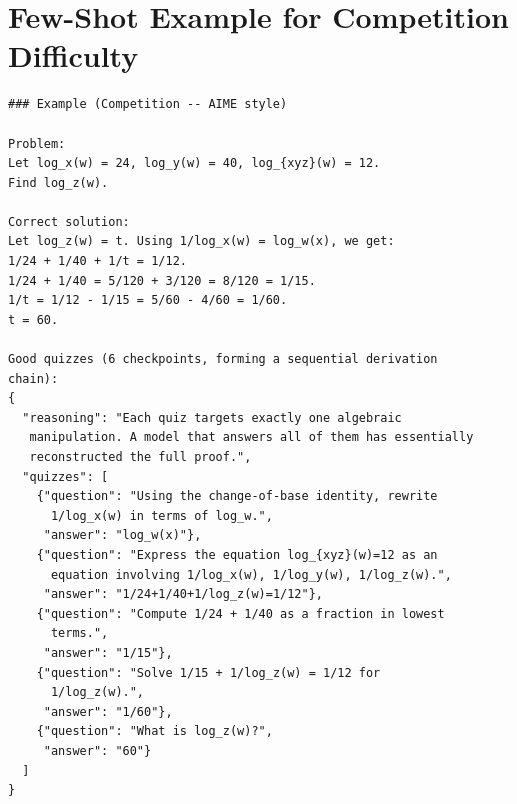 \documentclass[12pt]{report}
\begin{document}
\section{Few-Shot Example for Competition Difficulty}
\label{app:fewshot-competition}

\begin{lstlisting}
### Example (Competition -- AIME style)

Problem:
Let log_x(w) = 24, log_y(w) = 40, log_{xyz}(w) = 12.
Find log_z(w).

Correct solution:
Let log_z(w) = t. Using 1/log_x(w) = log_w(x), we get:
1/24 + 1/40 + 1/t = 1/12.
1/24 + 1/40 = 5/120 + 3/120 = 8/120 = 1/15.
1/t = 1/12 - 1/15 = 5/60 - 4/60 = 1/60.
t = 60.

Good quizzes (6 checkpoints, forming a sequential derivation
chain):
{
  "reasoning": "Each quiz targets exactly one algebraic
   manipulation. A model that answers all of them has essentially
   reconstructed the full proof.",
  "quizzes": [
    {"question": "Using the change-of-base identity, rewrite
      1/log_x(w) in terms of log_w.",
     "answer": "log_w(x)"},
    {"question": "Express the equation log_{xyz}(w)=12 as an
      equation involving 1/log_x(w), 1/log_y(w), 1/log_z(w).",
     "answer": "1/24+1/40+1/log_z(w)=1/12"},
    {"question": "Compute 1/24 + 1/40 as a fraction in lowest
      terms.",
     "answer": "1/15"},
    {"question": "Solve 1/15 + 1/log_z(w) = 1/12 for
      1/log_z(w).",
     "answer": "1/60"},
    {"question": "What is log_z(w)?",
     "answer": "60"}
  ]
}
\end{lstlisting}
\end{document}

